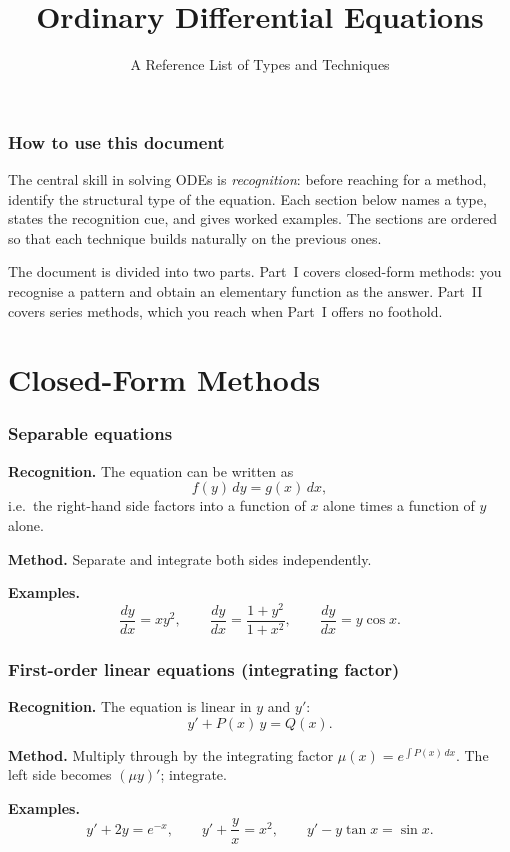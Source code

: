 \documentclass{essay}
\title{Ordinary Differential Equations}
\subtitle{A Reference List of Types and Techniques}
\author{}
\date{}
\begin{document}
\maketitle

\section*{How to use this document}

The central skill in solving ODEs is \emph{recognition}: before reaching for a method, identify the structural type of the equation.  Each section below names a type, states the recognition cue, and gives worked examples.  The sections are ordered so that each technique builds naturally on the previous ones.

The document is divided into two parts.  Part~I covers closed-form methods: you recognise a pattern and obtain an elementary function as the answer.  Part~II covers series methods, which you reach when Part~I offers no foothold.

\part{Closed-Form Methods}

\section{Separable equations}

\textbf{Recognition.}  The equation can be written as
\[
  f(y)\,dy = g(x)\,dx,
\]
i.e.\ the right-hand side factors into a function of $x$ alone times a function of $y$ alone.

\textbf{Method.}  Separate and integrate both sides independently.

\textbf{Examples.}
\[
  \frac{dy}{dx} = xy^2, \qquad
  \frac{dy}{dx} = \frac{1+y^2}{1+x^2}, \qquad
  \frac{dy}{dx} = y\cos x.
\]

\section{First-order linear equations (integrating factor)}

\textbf{Recognition.}  The equation is linear in $y$ and $y'$:
\[
  y' + P(x)\,y = Q(x).
\]

\textbf{Method.}  Multiply through by the integrating factor $\mu(x) = e^{\int P(x)\,dx}$.  The left side becomes $(\mu y)'$; integrate.

\textbf{Examples.}
\[
  y' + 2y = e^{-x}, \qquad
  y' + \frac{y}{x} = x^2, \qquad
  y' - y\tan x = \sin x.
\]
\end{document}
